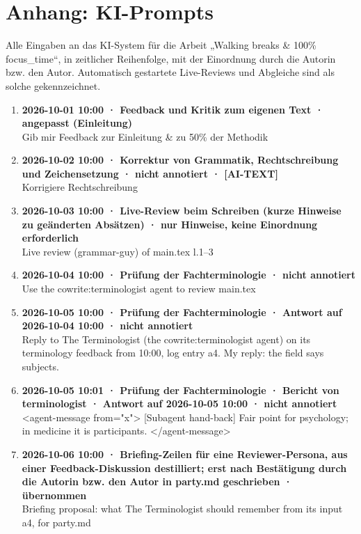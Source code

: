 \section*{Anhang: KI-Prompts}

Alle Eingaben an das KI-System für die Arbeit „Walking breaks \& 100\% focus\_time“, in zeitlicher Reihenfolge, mit der Einordnung durch die Autorin bzw. den Autor. Automatisch gestartete Live-Reviews und Abgleiche sind als solche gekennzeichnet.

\begin{enumerate}
  \item \textbf{2026-10-01 10:00 · Feedback und Kritik zum eigenen Text · angepasst (Einleitung)} \\
  Gib mir Feedback zur Einleitung \& zu 50\% der Methodik
  \item \textbf{2026-10-02 10:00 · Korrektur von Grammatik, Rechtschreibung und Zeichensetzung · nicht annotiert · [AI-TEXT]} \\
  Korrigiere Rechtschreibung
  \item \textbf{2026-10-03 10:00 · Live-Review beim Schreiben (kurze Hinweise zu geänderten Absätzen) · nur Hinweise, keine Einordnung erforderlich} \\
  Live review (grammar-guy) of main.tex l.1–3
  \item \textbf{2026-10-04 10:00 · Prüfung der Fachterminologie · nicht annotiert} \\
  Use the cowrite:terminologist agent to review main.tex
  \item \textbf{2026-10-05 10:00 · Prüfung der Fachterminologie · Antwort auf 2026-10-04 10:00 · nicht annotiert} \\
  Reply to The Terminologist (the cowrite:terminologist agent) on its terminology feedback from 10:00, log entry a4. My reply: the field says subjects.
  \item \textbf{2026-10-05 10:01 · Prüfung der Fachterminologie · Bericht von terminologist · Antwort auf 2026-10-05 10:00 · nicht annotiert} \\
  <agent-message from="x"> [Subagent hand-back] Fair point for psychology; in medicine it is participants. </agent-message>
  \item \textbf{2026-10-06 10:00 · Briefing-Zeilen für eine Reviewer-Persona, aus einer Feedback-Diskussion destilliert; erst nach Bestätigung durch die Autorin bzw. den Autor in party.md geschrieben · übernommen} \\
  Briefing proposal: what The Terminologist should remember from its input a4, for party.md

\end{enumerate}
